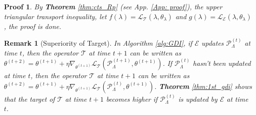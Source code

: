 \documentclass[nohyperref]{article}
\theoremstyle{plain}
\newtheorem*{Remark}{\textbf{Remark}}
\newtheorem*{Proof}{\textbf{Proof}}
\begin{document}
\begin{Proof}
    By \textbf{Theorem} \ref{thm:cts_Rp} (see App. \ref{App: proof}), the upper triangular transport inequality, 
    let $f(\lambda) = \mathcal{L}_{\mathcal{T}} (\lambda, \theta_{\lambda})$ and 
    $g(\lambda) = \mathcal{L}_{\mathcal{E}} (\lambda, \theta_{\lambda})$,
    the proof is done.
\end{Proof}

\begin{Remark}[Superiority of Target]
     In Algorithm \ref{alg:GDI}, if $\mathcal{E}$ updates $\mathcal{P}_{\Lambda}^{(t)}$ at time $t$, then the operator $\mathcal{T}$ at time $t+1$ can be written as $\theta^{(t+2)} = \theta^{(t+1)} + \eta \nabla_{\theta^{(t+1)}} \mathcal{L}_{\mathcal{T}} (\mathcal{P}_{\Lambda}^{(t+1)}, \theta^{(t+1)})$.
     If $\mathcal{P}_{\Lambda}^{(t)}$ hasn't been updated at time $t$, then the operator $\mathcal{T}$ at time $t+1$ can be written as $\theta^{(t+2)} = \theta^{(t+1)} + \eta \nabla_{\theta^{(t+1)}} \mathcal{L}_{\mathcal{T}} (\mathcal{P}_{\Lambda}^{(t)}, \theta^{(t+1)})$.
     \textbf{Theorem} \ref{thm:1st_gdi} shows that the target of $\mathcal{T}$ at time $t+1$ becomes higher if $\mathcal{P}_{\Lambda}^{(t)}$ is updated by $\mathcal{E}$ at time $t$.
\end{Remark}
\end{document}
